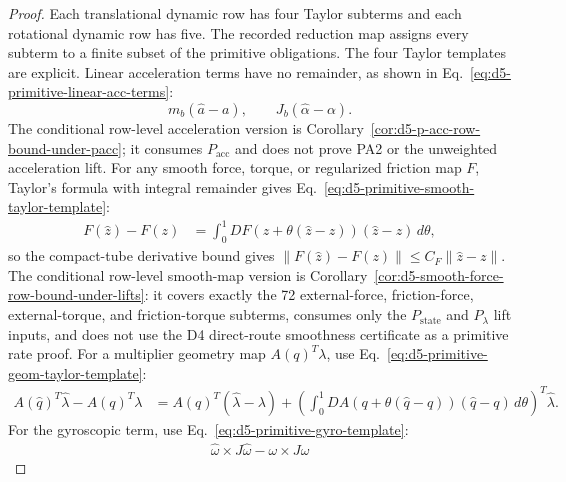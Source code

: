 \documentclass[preprint,12pt]{elsarticle}
\begin{document}
\begin{proof}
Each translational dynamic row has four Taylor subterms and each rotational
dynamic row has five.  The recorded reduction map assigns every subterm to a
finite subset of the primitive obligations.  The four Taylor templates are
explicit.  Linear acceleration terms have no remainder, as shown in
Eq.~\eqref{eq:d5-primitive-linear-acc-terms}:
\begin{equation}
\label{eq:d5-primitive-linear-acc-terms}
 m_b(\widehat a-a),\qquad J_b(\widehat\alpha-\alpha).
\end{equation}
The conditional row-level acceleration version is
Corollary~\ref{cor:d5-p-acc-row-bound-under-pacc}; it consumes
\(P_{\mathrm{acc}}\) and does not prove PA2 or the unweighted acceleration
lift.
For any smooth force, torque, or regularized friction map \(F\), Taylor's
formula with integral remainder gives
Eq.~\eqref{eq:d5-primitive-smooth-taylor-template}:
\begin{equation}
\label{eq:d5-primitive-smooth-taylor-template}
\begin{aligned}
 F(\widehat z)-F(z)
 &=
 \int_0^1 DF(z+\theta(\widehat z-z))(\widehat z-z)\,d\theta ,
\end{aligned}
\end{equation}
so the compact-tube derivative bound gives
\(\|F(\widehat z)-F(z)\|\le C_F\|\widehat z-z\|\).  The conditional
row-level smooth-map version is
Corollary~\ref{cor:d5-smooth-force-row-bound-under-lifts}: it covers exactly
the 72 external-force, friction-force, external-torque, and friction-torque
subterms, consumes only the \(P_{\mathrm{state}}\) and \(P_{\lambda}\) lift
inputs, and does not use the D4 direct-route smoothness certificate as a
primitive rate proof.
For a multiplier geometry
map \(A(q)^T\lambda\), use
Eq.~\eqref{eq:d5-primitive-geom-taylor-template}:
\begin{equation}
\label{eq:d5-primitive-geom-taylor-template}
\begin{aligned}
 A(\widehat q)^T\widehat\lambda-A(q)^T\lambda
 &=
 A(q)^T(\widehat\lambda-\lambda)
 +\left(\int_0^1 DA(q+\theta(\widehat q-q))(\widehat q-q)\,d\theta\right)^T
 \widehat\lambda .
\end{aligned}
\end{equation}
For the gyroscopic term, use Eq.~\eqref{eq:d5-primitive-gyro-template}:
\begin{equation}
\label{eq:d5-primitive-gyro-template}
\begin{aligned}
 \widehat\omega\times J\widehat\omega-\omega\times J\omega

\end{aligned}
\end{equation}
\end{proof}
\end{document}
